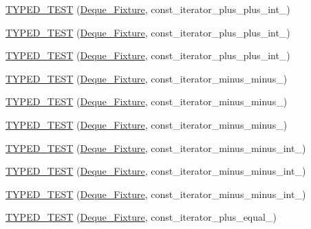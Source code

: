 \begin{DoxyCompactItemize}
\item 
\hyperlink{TestDeque_8c_09_09_aaea0e48306a9308dd3b49eb5d57fc7d6}{T\-Y\-P\-E\-D\-\_\-\-T\-E\-S\-T} (\hyperlink{structDeque__Fixture}{Deque\-\_\-\-Fixture}, const\-\_\-iterator\-\_\-plus\-\_\-plus\-\_\-int\-\_)
\item 
\hyperlink{TestDeque_8c_09_09_a80494e82f809687fa19d06375d9b8d1b}{T\-Y\-P\-E\-D\-\_\-\-T\-E\-S\-T} (\hyperlink{structDeque__Fixture}{Deque\-\_\-\-Fixture}, const\-\_\-iterator\-\_\-plus\-\_\-plus\-\_\-int\-\_)
\item 
\hyperlink{TestDeque_8c_09_09_ae7037363d29d1b46a8af9dd79b5c12f8}{T\-Y\-P\-E\-D\-\_\-\-T\-E\-S\-T} (\hyperlink{structDeque__Fixture}{Deque\-\_\-\-Fixture}, const\-\_\-iterator\-\_\-plus\-\_\-plus\-\_\-int\-\_)
\item 
\hyperlink{TestDeque_8c_09_09_a78e566b9e2b6c56012cee1793c41db15}{T\-Y\-P\-E\-D\-\_\-\-T\-E\-S\-T} (\hyperlink{structDeque__Fixture}{Deque\-\_\-\-Fixture}, const\-\_\-iterator\-\_\-minus\-\_\-minus\-\_)
\item 
\hyperlink{TestDeque_8c_09_09_a99b8b23659c201f027a901df5e90bf5b}{T\-Y\-P\-E\-D\-\_\-\-T\-E\-S\-T} (\hyperlink{structDeque__Fixture}{Deque\-\_\-\-Fixture}, const\-\_\-iterator\-\_\-minus\-\_\-minus\-\_)
\item 
\hyperlink{TestDeque_8c_09_09_a1c91be37c1ab8e606d461dc032d4381c}{T\-Y\-P\-E\-D\-\_\-\-T\-E\-S\-T} (\hyperlink{structDeque__Fixture}{Deque\-\_\-\-Fixture}, const\-\_\-iterator\-\_\-minus\-\_\-minus\-\_)
\item 
\hyperlink{TestDeque_8c_09_09_ae4d2b7bb519a89a5f918fdedfd86b911}{T\-Y\-P\-E\-D\-\_\-\-T\-E\-S\-T} (\hyperlink{structDeque__Fixture}{Deque\-\_\-\-Fixture}, const\-\_\-iterator\-\_\-minus\-\_\-minus\-\_\-int\-\_)
\item 
\hyperlink{TestDeque_8c_09_09_a14096073ba382c32887b947e560301bc}{T\-Y\-P\-E\-D\-\_\-\-T\-E\-S\-T} (\hyperlink{structDeque__Fixture}{Deque\-\_\-\-Fixture}, const\-\_\-iterator\-\_\-minus\-\_\-minus\-\_\-int\-\_)
\item 
\hyperlink{TestDeque_8c_09_09_ac38ac7926ca821b6c0a6ebd9d5eeefd0}{T\-Y\-P\-E\-D\-\_\-\-T\-E\-S\-T} (\hyperlink{structDeque__Fixture}{Deque\-\_\-\-Fixture}, const\-\_\-iterator\-\_\-minus\-\_\-minus\-\_\-int\-\_)
\item 
\hyperlink{TestDeque_8c_09_09_a64c4ba1e33b218f7248e0503d2052995}{T\-Y\-P\-E\-D\-\_\-\-T\-E\-S\-T} (\hyperlink{structDeque__Fixture}{Deque\-\_\-\-Fixture}, const\-\_\-iterator\-\_\-plus\-\_\-equal\-\_)
\item 

\end{DoxyCompactItemize}

